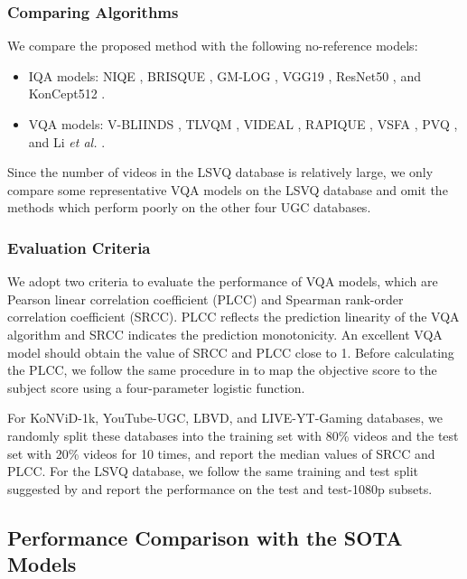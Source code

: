 \documentclass[sigconf]{acmart}
\begin{document}
\subsubsection{Comparing Algorithms}
We compare the proposed method with the following no-reference models:
\begin{itemize}
    \item IQA models: NIQE \cite{mittal2012making}, BRISQUE \cite{mittal2012no}, GM-LOG \cite{xue2014blind}, VGG19 \cite{simonyan2014very}, ResNet50 \cite{he2016deep}, and KonCept512 \cite{hosu2020koniq}.
    \item VQA models:  V-BLIINDS \cite{saad2014blind}, TLVQM \cite{korhonen2019two}, VIDEAL \cite{tu2021ugc}, RAPIQUE \cite{tu2021rapique}, VSFA \cite{li2019quality}, PVQ \cite{ying2021patch}, and Li \textit{et al.} \cite{li2021blindly}.
\end{itemize}

Since the number of videos in the LSVQ database is relatively large, we only compare some representative VQA models on the LSVQ database and omit the methods which perform poorly on the other four UGC databases.

\subsubsection{Evaluation Criteria}
We adopt two criteria to evaluate the performance of VQA models, which are Pearson linear correlation coefficient (PLCC) and Spearman rank-order correlation coefficient (SRCC).
PLCC reflects the prediction linearity of the VQA algorithm and SRCC indicates the prediction monotonicity. An excellent VQA model should obtain the value of SRCC and PLCC close to 1.
Before calculating the PLCC, we follow the same procedure in \cite{antkowiak2000final} to map the objective score to the subject score using a four-parameter logistic function.

For KoNViD-1k, YouTube-UGC, LBVD, and LIVE-YT-Gaming databases, we randomly split these databases into the training set with 80\% videos and the test set with 20\% videos for 10 times, and report the median values of SRCC and PLCC. For the LSVQ database, we follow the same training and test split suggested by \cite{ying2021patch} and report the performance on the test and test-1080p subsets.

\subsection{Performance Comparison with the SOTA Models}
\end{document}
